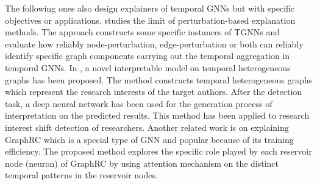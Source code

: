 The following ones also design explainers of temporal GNNs but with specific objectives or applications. \cite{vu2022limit} studies the limit of perturbation-based explanation methods. The approach constructs some specific instances of TGNNs and evaluate how reliably node-perturbation, edge-perturbation or both can reliably identify specific graph components carrying out the temporal aggregation in temporal GNNs.
In \cite{yang2023interpretable}, a novel interpretable model on temporal heterogeneous graphs has been proposed. The method constructs
temporal heterogeneous graphs which represent the research interests of the target authors. After the detection task, a deep neural network has been used for the generation process of interpretation on the predicted results. This method has been applied to research interest shift detection of researchers. 
Another related work \cite{han2022interpretable} is on explaining GraphRC which is a special type of GNN and popular because of its training efficiency.  
The proposed method explores the specific role played by each reservoir node (neuron) of GraphRC by using attention mechanism on the distinct temporal patterns in the reservoir nodes.




